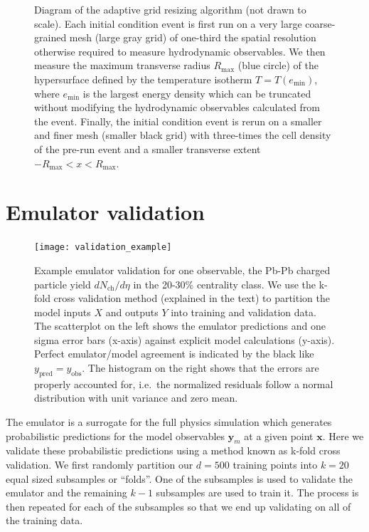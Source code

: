 \documentclass[aps,prc,reprint,amsmath,nofootinbib]{revtex4-1}
\newcommand{\nch}{N_\text{ch}}
\newcommand{\x}{\mathbf{x}}
\newcommand{\y}{\mathbf{y}}
\begin{document}
\begin{figure}
  \caption{Diagram of the adaptive grid resizing algorithm (not drawn to scale). Each initial condition event is first run on a very large coarse-grained mesh (large gray grid) of one-third the spatial resolution otherwise required to measure hydrodynamic observables. We then measure the maximum transverse radius $R_\text{max}$ (blue circle) of the hypersurface defined by the temperature isotherm $T = T(e_\text{min})$, where $e_\text{min}$ is the largest energy density which can be truncated without modifying the hydrodynamic observables calculated from the event. Finally, the initial condition event is rerun on a smaller and finer mesh (smaller black grid) with three-times the cell density of the pre-run event and a smaller transverse extent $-R_\text{max} < x < R_\text{max}$.}
  \label{fig:adaptive_grid}
\end{figure}

\section{Emulator validation}
\label{app:validation}

\begin{figure}
  \texttt{[image: validation\_example]}
  \caption{Example emulator validation for one observable, the Pb-Pb charged particle yield $d\nch/d\eta$ in the 20-30\% centrality class. We use the k-fold cross validation method (explained in the text) to partition the model inputs $X$ and outputs $Y$ into training and validation data. The scatterplot on the left shows the emulator predictions and one sigma error bars (x-axis) against explicit model calculations (y-axis). Perfect emulator/model agreement is indicated by the black like $y_\text{pred}=y_\text{obs}$. The histogram on the right shows that the errors are properly accounted for, i.e.\ the normalized residuals follow a normal distribution with unit variance and zero mean.
  }
  \label{fig:validation_example}
\end{figure}

The emulator is a surrogate for the full physics simulation which generates probabilistic predictions for the model observables $\y_m$ at a given point $\x$.
Here we validate these probabilistic predictions using a method known as k-fold cross validation.
We first randomly partition our $d=500$ training points into $k=20$ equal sized subsamples or ``folds''.
One of the subsamples is used to validate the emulator and the remaining $k-1$ subsamples are used to train it.
The process is then repeated for each of the subsamples so that we end up validating on all of the training data.
\end{document}
